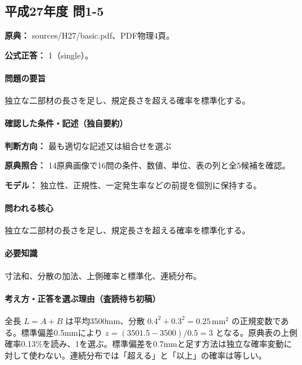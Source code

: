 \subsection{平成27年度 問1-5}
\label{q:h27-reg-basic-1-5}

\noindent\textbf{原典：} sources/H27/basic.pdf、PDF物理4頁。

\textbf{公式正答：} 1（single）。

\paragraph{問題の要旨} 独立な二部材の長さを足し、規定長さを超える確率を標準化する。

\paragraph{確認した条件・記述（独自要約）}\mbox{}\par

\noindent\textbf{判断方向：} 最も適切な記述又は組合せを選ぶ\par

\noindent\textbf{原典照合：} 14原典画像で16問の条件、数値、単位、表の列と全5候補を確認。\par

\noindent\textbf{モデル：} 独立性、正規性、一定発生率などの前提を個別に保持する。\par

\paragraph{問われる核心} 独立な二部材の長さを足し、規定長さを超える確率を標準化する。

\paragraph{必要知識} 寸法和、分散の加法、上側確率と標準化、連続分布。

\paragraph{考え方・正答を選ぶ理由（査読待ち初稿）} 全長 \(L=A+B\) は平均3500mm、分散 \(0.4^2+0.3^2=0.25\,\mathrm{mm^2}\) の正規変数である。標準偏差0.5mmにより \(z=(3501.5-3500)/0.5=3\) となる。原典表の上側確率0.13\%を読み、1を選ぶ。標準偏差を0.7mmと足す方法は独立な確率変動に対して使わない。連続分布では「超える」と「以上」の確率は等しい。


